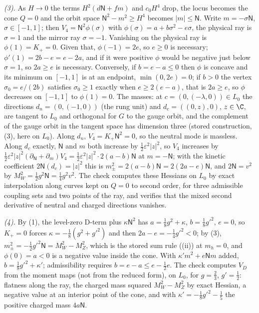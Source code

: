 \emph{(3).} As $H \to 0$ the terms $H^{2}(d\mathsf{N} + fm)$ and $c_{0}H^{4}$ drop, the locus becomes the cone $Q = 0$ and the orbit space $\mathsf{N}^{2} - m^{2} \ge H^{4}$ becomes $|m| \le \mathsf{N}$. Write $m = -\sigma \mathsf{N}$, $\sigma \in [-1, 1]$; then $V_{4} = \mathsf{N}^{2}\phi(\sigma)$ with $\phi(\sigma) = a + b\sigma^{2} - e\sigma$, the physical ray is $\sigma = 1$ and the mirror ray $\sigma = -1$. Vanishing on the physical ray is $\phi(1) = K_{+} = 0$. Given that, $\phi(-1) = 2e$, so $e \ge 0$ is necessary; $\phi'(1) = 2b - e = e - 2a$, and if it were positive $\phi$ would be negative just below $\sigma = 1$, so $2a \ge e$ is necessary. Conversely, if $b = e - a \le 0$ then $\phi$ is concave and its minimum on $[-1, 1]$ is at an endpoint, $\min(0, 2e) = 0$; if $b > 0$ the vertex $\sigma_{0} = e/(2b)$ satisfies $\sigma_{0} \ge 1$ exactly when $e \ge 2(e - a)$, that is $2a \ge e$, so $\phi$ decreases on $[-1, 1]$ to $\phi(1) = 0$. The masses: at $c = (0, (-\lambda, 0)) \in L_{0}$ the directions $d_{n} = (0, (-1, 0))$ (the rung unit) and $d_{c} = ((0, z), 0)$, $z \in \C$, are tangent to $L_{0}$ and orthogonal for $G$ to the gauge orbit, and the complement of the gauge orbit in the tangent space has dimension three (stored construction, (3), here on $L_{0}$). Along $d_{n}$, $V_{4} = K_{+}\mathsf{N}^{2} = 0$, so the neutral mode is massless. Along $d_{c}$ exactly, $\mathsf{N}$ and $m$ both increase by $\tfrac12\varepsilon^{2}|z|^{2}$, so $V_{4}$ increases by $\tfrac12\varepsilon^{2}|z|^{2}(\partial_{\mathsf{N}} + \partial_{m})V_{4} = \tfrac12\varepsilon^{2}|z|^{2}\cdot 2(a - b)\mathsf{N}$ at $m = -\mathsf{N}$; with the kinetic coefficient $2\mathsf{N}(d_{c}) = |z|^{2}$ this is $m_{\pm}^{2} = 2(a - b)\mathsf{N} = 2(2a - e)\mathsf{N}$, and $2\mathsf{N} = v^{2}$ by $M_{W}^{2} = \tfrac12 g^{2}\mathsf{N} = \tfrac14 g^{2}v^{2}$. The check computes these Hessians on $L_{0}$ by exact interpolation along curves kept on $Q = 0$ to second order, for three admissible coupling sets and two points of the ray, and verifies that the mixed second derivative of neutral and charged directions vanishes.

\emph{(4).} By (1), the level-zero D-term plus $\kappa \mathsf{N}^{2}$ has $a = \tfrac18 g^{2} + \kappa$, $b = \tfrac18 g'^{2}$, $e = 0$, so $K_{+} = 0$ forces $\kappa = -\tfrac18(g^{2} + g'^{2})$ and then $2a - e = -\tfrac14 g'^{2} < 0$; by (3), $m_{\pm}^{2} = -\tfrac12 g'^{2}\mathsf{N} = M_{W}^{2} - M_{Z}^{2}$, which is the stored sum rule ((ii)) at $m_{h} = 0$, and $\phi(0) = a < 0$ is a negative value inside the cone. With $\kappa'm^{2} + e\mathsf{N}m$ added, $b = \tfrac18 g'^{2} + \kappa'$; admissibility requires $b = e - a \le e - \tfrac12 e$. The check computes $V_{D}$ from the moment maps (not from the reduced form), on $L_{0}$, for $g = \tfrac23$, $g' = \tfrac12$: flatness along the ray, the charged mass squared $M_{W}^{2} - M_{Z}^{2}$ by exact Hessian, a negative value at an interior point of the cone, and with $\kappa' = -\tfrac18 g'^{2} - \tfrac15$ the positive charged mass $4a\mathsf{N}$.

